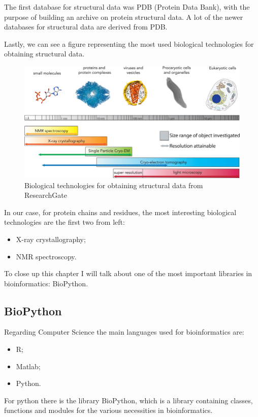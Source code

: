 The first database for structural data was PDB (Protein Data Bank), with the purpose of building an archive on protein structural data. A lot of the newer databases for structural data are derived from PDB.

Lastly, we can see a figure representing the most used biological technologies for obtaining structural data.

\begin{figure}[h!]
    \centering
    \includegraphics[scale=0.6]{res/proteins_overview/methods_structural.png}
    \caption{Biological technologies for obtaining structural data from ResearchGate \cite{biotechs}}
\end{figure}

In our case, for protein chains and residues, the most interesting biological technologies are the first two from left:
\begin{itemize}
    \item X-ray crystallography;
    \item NMR spectroscopy.
\end{itemize}

To close up this chapter I will talk about one of the most important libraries in bioinformatics: BioPython.
\subsection{BioPython}
Regarding Computer Science the main languages used for bioinformatics are:
\begin{itemize}
    \item R;
    \item Matlab;
    \item Python.
\end{itemize}
For python there is the library BioPython, which is a library containing classes, functions and modules for the various necessities in bioinformatics.

